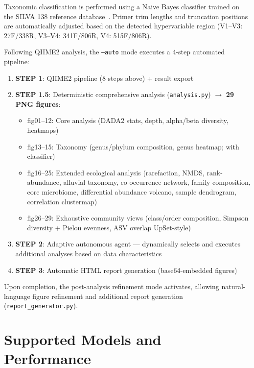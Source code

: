 \documentclass[12pt, a4paper]{article}
\begin{document}
Taxonomic classification is performed using a Naive Bayes classifier
trained on the SILVA 138 reference database~\cite{silva}.
Primer trim lengths and truncation positions are automatically
adjusted based on the detected hypervariable region
(V1--V3: 27F/338R, V3--V4: 341F/806R, V4: 515F/806R).

Following QIIME2 analysis, the \texttt{--auto} mode executes a 4-step
automated pipeline:

\begin{enumerate}[leftmargin=2em]
  \item \textbf{STEP 1}: QIIME2 pipeline (8 steps above) + result export
  \item \textbf{STEP 1.5}: Deterministic comprehensive analysis (\texttt{analysis.py})
    $\to$ \textbf{29 PNG figures}:
    \begin{itemize}
      \item fig01--12: Core analysis (DADA2 stats, depth, alpha/beta diversity, heatmaps)
      \item fig13--15: Taxonomy (genus/phylum composition, genus heatmap; with classifier)
      \item fig16--25: Extended ecological analysis (rarefaction, NMDS, rank-abundance,
        alluvial taxonomy, co-occurrence network, family composition, core microbiome,
        differential abundance volcano, sample dendrogram, correlation clustermap)
      \item fig26--29: Exhaustive community views (class/order composition,
        Simpson diversity + Pielou evenness, ASV overlap UpSet-style)
    \end{itemize}
  \item \textbf{STEP 2}: Adaptive autonomous agent --- dynamically selects
    and executes additional analyses based on data characteristics
  \item \textbf{STEP 3}: Automatic HTML report generation (base64-embedded figures)
\end{enumerate}

Upon completion, the post-analysis refinement mode activates, allowing
natural-language figure refinement and additional report generation
(\texttt{report\_generator.py}).

\section{Supported Models and Performance}
\end{document}
